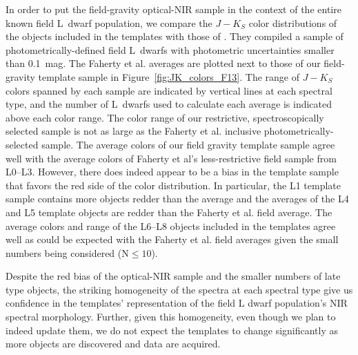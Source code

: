 \documentclass[12pt,preprint]{aastex}
\begin{document}
In order to put the field-gravity optical-NIR sample in the context of the entire known field L~dwarf population, we compare the $J-K_S$ color distributions of the objects included in the templates with those of \citet{Faherty13_0355}.
They compiled a sample of photometrically-defined field L~dwarfs with photometric uncertainties smaller than 0.1~mag.
The Faherty et al. averages are plotted next to those of our field-gravity template sample in Figure~\ref{fig:JK_colors_F13}.
The range of $J-K_S$ colors spanned by each sample are indicated by vertical lines at each spectral type, and the number of L~dwarfs used to calculate each average is indicated above each color range.
The color range of our restrictive, spectroscopically selected sample is not as large as the Faherty et al. inclusive photometrically-selected sample.
The average colors of our field gravity template sample agree well with the average colors of Faherty et al's less-restrictive field sample from L0--L3.
However, there does indeed appear to be a bias in the template sample that favors the red side of the color distribution.
In particular, the L1 template sample contains more objects redder than the average and the averages of the L4 and L5 template objects are redder than the Faherty et al. field average.
The average colors and range of the L6--L8 objects included in the templates agree well as could be expected with the Faherty et al. field averages given the small numbers being considered (N$\le10$).

Despite the red bias of the optical-NIR sample and the smaller numbers of late type objects, the striking homogeneity of the spectra at each spectral type give us confidence in the templates' representation of the field L dwarf population's NIR spectral morphology.
Further, given this homogeneity, even though we plan to indeed update them, we do not expect the templates to change significantly as more objects are discovered and data are acquired.


\end{document}
